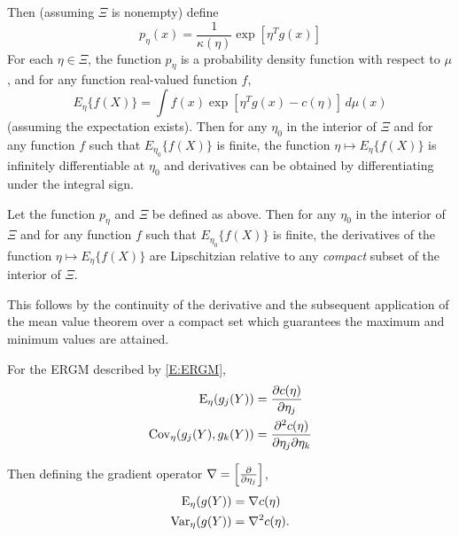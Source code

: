 \begin{corollary} \label{Cor:infinitely-differentiable}
Then (assuming $\Xi$ is nonempty) define
$$
   p_\eta(x) = \frac{1}{\kappa(\eta)} \exp [ \eta^T g(x) ]
$$
For each $\eta \in \Xi$, the function $p_\eta$ is a probability density
function with respect to $\mu$, and for any function real-valued function $f$,
$$
   E_\eta\{ f(X) \} = \int f(x) \exp [ \eta^T g(x) - c(\eta) ] \, d \mu(x)
$$
(assuming the expectation exists).  Then for
any $\eta_0$ in the interior of $\Xi$ and
for any function $f$ such that $E_{\eta_0}\{ f(X) \}$ is finite, the
function $\eta \mapsto E_\eta\{ f(X) \}$ is infinitely differentiable at
$\eta_0$ and derivatives can be obtained by differentiating under the integral
sign.  
\end{corollary}

\begin{corollary} \label{Cor:Lipschitzian}
Let the function $p_\eta$ and $\Xi$ be defined as above.  Then for
any $\eta_0$ in the interior of $\Xi$ and
for any function $f$ such that $E_{\eta_0}\{ f(X) \}$ is finite, the derivatives of the function $\eta \mapsto E_\eta\{ f(X) \}$ are Lipschitzian relative to any \emph{compact} subset of the interior of $\Xi$.
\end{corollary}
This follows by the continuity of the derivative and the subsequent application of the mean value theorem over a compact set which guarantees the maximum and minimum values are attained.

\begin{corollary} \label{Cor:ExpFam_Deriv}
For 
the ERGM described by \eqref{E:ERGM},
\begin{align}
	\operatorname{E}_\eta(g_j(Y)) &= \frac{\partial c(\eta)}{\partial \eta_j}  \label{E:Expectation}\\
	\operatorname{Cov}_\eta  ( g_j(Y), g_k(Y)  ) &= \frac{\partial^2  c(\eta) }{\partial \eta_j \partial \eta_k} \label{E:Cov}
\end{align}

Then defining the gradient operator $\nabla = \left [ \frac{\partial }{\partial \eta_j} \right ]$,
\begin{align*}
	\operatorname{E}_\eta(g(Y)) &= \nabla c(\eta)	\\
	\operatorname{Var}_\eta(g(Y)) &= \nabla^2 c( \eta ). 	\label{E:Varmat}
\end{align*}
\end{corollary}


